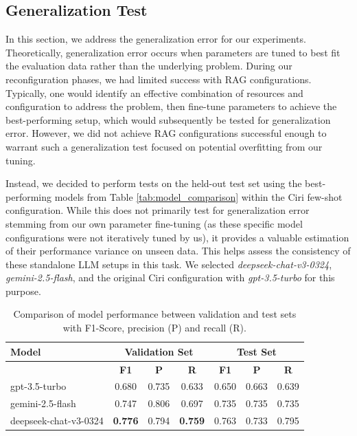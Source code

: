 \subsection{Generalization Test} \label{sec:exp_generalization}

In this section, we address the generalization error for our experiments. Theoretically, generalization error occurs when parameters are tuned to best fit the evaluation data rather than the underlying problem. During our reconfiguration phases, we had limited success with RAG configurations. Typically, one would identify an effective combination of resources and configuration to address the problem, then fine-tune parameters to achieve the best-performing setup, which would subsequently be tested for generalization error. However, we did not achieve RAG configurations successful enough to warrant such a generalization test focused on potential overfitting from our tuning.

Instead, we decided to perform tests on the held-out test set using the best-performing models from Table \ref{tab:model_comparison} within the Ciri few-shot configuration. While this does not primarily test for generalization error stemming from our own parameter fine-tuning (as these specific model configurations were not iteratively tuned by us), it provides a valuable estimation of their performance variance on unseen data. This helps assess the consistency of these standalone LLM setups in this task. We selected \textit{deepseek-chat-v3-0324}, \textit{gemini-2.5-flash}, and the original Ciri configuration with \textit{gpt-3.5-turbo} for this purpose. 

\begin{table}[h]
    \centering
    \begin{tabular}{|l|c|c|c|c|c|c|}
        \hline
        \textbf{Model} & \multicolumn{3}{c|}{\textbf{Validation Set}} & \multicolumn{3}{c|}{\textbf{Test Set}} \\
        \hline
        & \textbf{F1} & \textbf{P} & \textbf{R} & \textbf{F1} &  \textbf{P} & \textbf{R} \\
        \hline
        gpt-3.5-turbo          & 0.680 & 0.735 & 0.633 & 0.650 & 0.663 & 0.639 \\
        gemini-2.5-flash       & 0.747 & 0.806 & 0.697 & 0.735 & 0.735 & 0.735 \\
        deepseek-chat-v3-0324  & \textbf{0.776} & 0.794 & \textbf{0.759} & 0.763 & 0.733 & 0.795 \\
        \hline
    \end{tabular}
    \caption{Comparison of model performance between validation and test sets with F1-Score, precision (P) and recall (R).}
    \label{tab:generalization_comparison}
\end{table}



